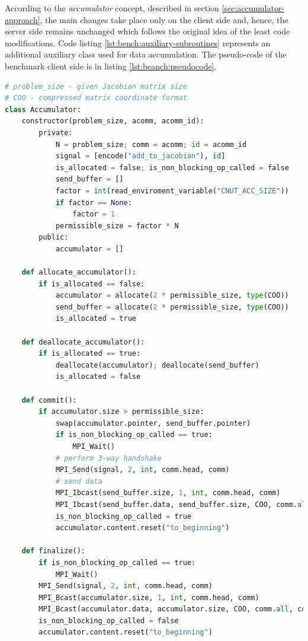 According to the \textit{accumulator} concept, described in section \ref{sec:accumulator-approach}, the main changes take place only on the client side and, hence, the server side remains unchanged which follows the original idea of the least code modifications. Code listing \ref{lst:bench:auxiliary-subroutines} represents an additional auxiliary class used for data accumulation. The pseudo-code of the benchmark client side is in listing \ref{lst:beanch:pseudocode}.\\ 


\begin{minipage}{\linewidth}
\begin{lstlisting}[language=python, caption={Pseudocode of the auxiliary class}, frame=single, label={lst:bench:auxiliary-subroutines}]
# problem_size - given Jacobian matrix size
# COO - compressed matrix coordinate format
class Accumulator:
	constructor(problem_size, acomm, acomm_id):
		private:
			N = problem_size; comm = acomm; id = acomm_id
			signal = [encode("add_to_jacobian"), id]
			is_allocated = false; is_non_blocking_op_called = false
			send_buffer = []
			factor = int(read_enviroment_variable("CNUT_ACC_SIZE"))
			if factor == None:
				factor = 1	
			permissible_size = factor * N	
		public: 
			accumulator = []
		
	def allocate_accumulator():
		if is_allocated == false:
			accumulator = allocate(2 * permissible_size, type(COO))			
			send_buffer = allocate(2 * permissible_size, type(COO))
			is_allocated = true

	def deallocate_accumulator():
		if is_allocated == true:
			deallocate(accumulator); deallocate(send_buffer)
			is_allocated = false
	
	def commit():
		if accumulator.size > permissible_size:
			swap(accumulator.pointer, send_buffer.pointer)
			if is_non_blocking_op_called == true:
				MPI_Wait()
			# perform 3-way handshake
			MPI_Send(signal, 2, int, comm.head, comm)
			# send data
			MPI_Ibcast(send_buffer.size, 1, int, comm.head, comm)
			MPI_Ibcast(send_buffer.data, send_buffer.size, COO, comm.all, comm)
			is_non_blocking_op_called = true
			accumulator.content.reset("to_beginning")
					
	def finalize():
		if is_non_blocking_op_called == true:
			MPI_Wait()
		MPI_Send(signal, 2, int, comm.head, comm)
		MPI_Bcast(accumulator.size, 1, int, comm.head, comm)
		MPI_Bcast(accumulator.data, accumulator.size, COO, comm.all, comm)
		is_non_blocking_op_called = false
		accumulator.content.reset("to_beginning")
\end{lstlisting}
\end{minipage}




